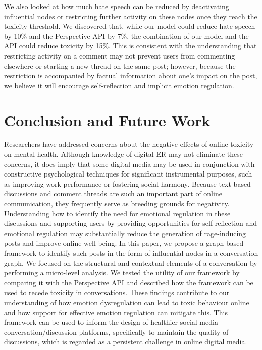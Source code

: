 \documentclass[acmtog]{acmart}
\begin{document}
We also looked at how much hate speech can be reduced by deactivating influential nodes or restricting further activity on these nodes once they reach the toxicity threshold. We discovered that, while our model could reduce hate speech by 10\% and the Perspective API by 7\%, the combination of our model and the API could reduce toxicity by 15\%. This is consistent with the understanding that restricting activity on a comment may not prevent users from commenting elsewhere or starting a new thread on the same post; however, because the restriction is accompanied by factual information about one's impact on the post, we believe it will encourage self-reflection and implicit emotion regulation.












\section{Conclusion and Future Work}
Researchers have addressed concerns about the negative effects of online toxicity on mental health. Although knowledge of digital ER may not eliminate these concerns, it does imply that some digital media may be used in conjunction with constructive psychological techniques for significant instrumental purposes, such as improving work performance or fostering social harmony. Because text-based discussions and comment threads are such an important part of online communication, they frequently serve as breeding grounds for negativity. Understanding how to identify the need for emotional regulation in these discussions and supporting users by providing opportunities for self-reflection and emotional regulation may substantially reduce the generation of rage-inducing posts and improve online well-being.
In this paper, we propose a graph-based framework to identify such posts in the form of influential nodes in a conversation graph. We focused on the structural and contextual elements of a conversation by performing a micro-level analysis. We tested the utility of our framework by comparing it with the Perspective API and described how the framework can be used to recede toxicity in conversations. These findings contribute to our understanding of how emotion dysregulation can lead to toxic behaviour online and how support for effective emotion regulation can mitigate this. This framework can be used to inform the design of healthier social media conversation/discussion platforms, specifically to maintain the quality of discussions, which is regarded as a persistent challenge in online digital media.
\end{document}
